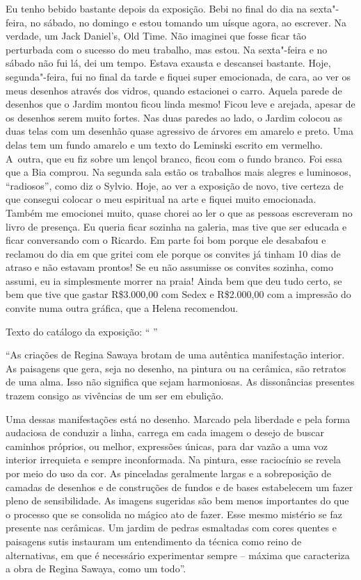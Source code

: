 Eu tenho bebido bastante depois da exposição. Bebi no final do dia na
sexta"-feira, no sábado, no domingo e estou tomando um uísque agora, ao
escrever. Na verdade, um Jack Daniel's, Old Time. Não imaginei que fosse
ficar tão perturbada com o sucesso do meu trabalho, mas estou. Na
sexta"-feira e no sábado não fui lá, dei um tempo. Estava exausta e
descansei bastante. Hoje, segunda"-feira, fui no final da tarde e fiquei
super emocionada, de cara, ao ver os meus desenhos através dos vidros,
quando estacionei o carro. Aquela parede de desenhos que o Jardim montou
ficou linda mesmo! Ficou leve e arejada, apesar de os desenhos serem
muito fortes. Nas duas paredes ao lado, o Jardim colocou as duas telas
com um desenhão quase agressivo de árvores em amarelo e preto. Uma delas
tem um fundo amarelo e um texto do Leminski escrito em vermelho. A~outra, que eu fiz sobre um lençol branco, ficou com o fundo branco. Foi
essa que a Bia comprou. Na segunda sala estão os trabalhos mais alegres
e luminosos, ``radiosos'', como diz o Sylvio. Hoje, ao ver a exposição
de novo, tive certeza de que consegui colocar o meu espiritual na arte e
fiquei muito emocionada. Também me emocionei muito, quase chorei ao ler
o que as pessoas escreveram no livro de presença. Eu queria ficar
sozinha na galeria, mas tive que ser educada e ficar conversando com o
Ricardo. Em parte foi bom porque ele desabafou e reclamou do dia em que
gritei com ele porque os convites já tinham 10 dias de atraso e não
estavam prontos! Se eu não assumisse os convites sozinha, como assumi,
eu ia simplesmente morrer na praia! Ainda bem que deu tudo certo, se bem
que tive que gastar R\$3.000,00 com Sedex e R\$2.000,00 com a impressão
do convite numa outra gráfica, que a Helena recomendou.

Texto do catálogo da exposição: `` ''

``As criações de Regina Sawaya brotam de uma autêntica manifestação
interior. As paisagens que gera, seja no desenho, na pintura ou na
cerâmica, são retratos de uma alma. Isso não significa que sejam
harmoniosas. As dissonâncias presentes trazem consigo as vivências de um
ser em ebulição.

Uma dessas manifestações está no desenho. Marcado pela liberdade e pela
forma audaciosa de conduzir a linha, carrega em cada imagem o desejo de
buscar caminhos próprios, ou melhor, expressões únicas, para dar vazão a
uma voz interior irrequieta e sempre inconformada. Na pintura, esse
raciocínio se revela por meio do uso da cor. As pinceladas geralmente
largas e a sobreposição de camadas de desenhos e de construções de
fundos e de bases estabelecem um fazer pleno de sensibilidade. As
imagens sugeridas são bem menos importantes do que o processo que se
consolida no mágico ato de fazer. Esse mesmo mistério se faz presente
nas cerâmicas. Um jardim de pedras esmaltadas com cores quentes e
paisagens sutis instauram um entendimento da técnica como reino de
alternativas, em que é necessário experimentar sempre -- máxima que
caracteriza a obra de Regina Sawaya, como um todo''.

